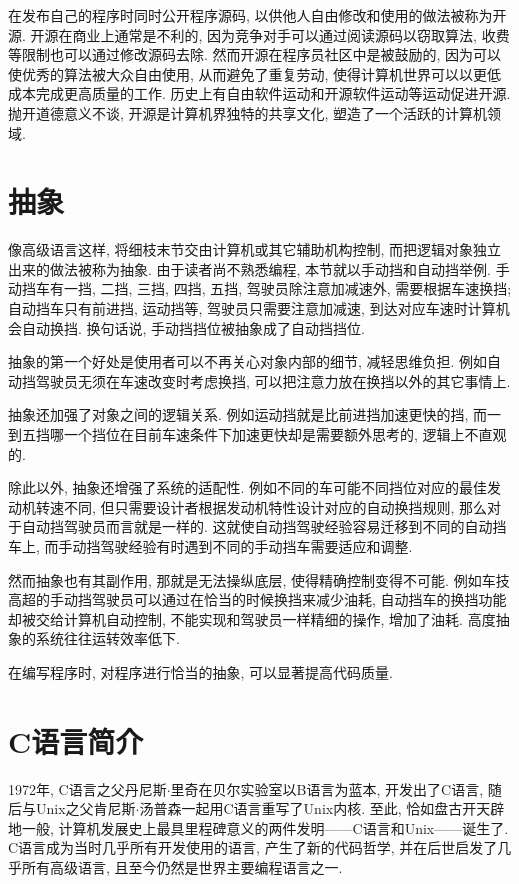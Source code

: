         在发布自己的程序时同时公开程序源码, 以供他人自由修改和使用的做法被称为开源. 开源在商业上通常是不利的, 因为竞争对手可以通过阅读源码以窃取算法, 收费等限制也可以通过修改源码去除. 然而开源在程序员社区中是被鼓励的, 因为可以使优秀的算法被大众自由使用, 从而避免了重复劳动, 使得计算机世界可以以更低成本完成更高质量的工作. 历史上有自由软件运动和开源软件运动等运动促进开源. 抛开道德意义不谈, 开源是计算机界独特的共享文化, 塑造了一个活跃的计算机领域.

    \section{抽象}
        像高级语言这样, 将细枝末节交由计算机或其它辅助机构控制, 而把逻辑对象独立出来的做法被称为抽象. 由于读者尚不熟悉编程, 本节就以手动挡和自动挡举例. 手动挡车有一挡, 二挡, 三挡, 四挡, 五挡, 驾驶员除注意加减速外, 需要根据车速换挡; 自动挡车只有前进挡, 运动挡等, 驾驶员只需要注意加减速, 到达对应车速时计算机会自动换挡. 换句话说, 手动挡挡位被抽象成了自动挡挡位.
        
        抽象的第一个好处是使用者可以不再关心对象内部的细节, 减轻思维负担. 例如自动挡驾驶员无须在车速改变时考虑换挡, 可以把注意力放在换挡以外的其它事情上.

        抽象还加强了对象之间的逻辑关系. 例如运动挡就是比前进挡加速更快的挡, 而一到五挡哪一个挡位在目前车速条件下加速更快却是需要额外思考的, 逻辑上不直观的.

        除此以外, 抽象还增强了系统的适配性. 例如不同的车可能不同挡位对应的最佳发动机转速不同, 但只需要设计者根据发动机特性设计对应的自动换挡规则, 那么对于自动挡驾驶员而言就是一样的. 这就使自动挡驾驶经验容易迁移到不同的自动挡车上, 而手动挡驾驶经验有时遇到不同的手动挡车需要适应和调整.
        
        然而抽象也有其副作用, 那就是无法操纵底层, 使得精确控制变得不可能. 例如车技高超的手动挡驾驶员可以通过在恰当的时候换挡来减少油耗, 自动挡车的换挡功能却被交给计算机自动控制, 不能实现和驾驶员一样精细的操作, 增加了油耗. 高度抽象的系统往往运转效率低下.

        在编写程序时, 对程序进行恰当的抽象, 可以显著提高代码质量.

    \section{C语言简介} \label{C语言简介}
        1972年, C语言之父丹尼斯$\cdot$里奇在贝尔实验室以B语言为蓝本, 开发出了C语言, 随后与Unix之父肯尼斯$\cdot$汤普森一起用C语言重写了Unix内核. 至此, 恰如盘古开天辟地一般, 计算机发展史上最具里程碑意义的两件发明——C语言和Unix——诞生了. C语言成为当时几乎所有开发使用的语言, 产生了新的代码哲学, 并在后世启发了几乎所有高级语言, 且至今仍然是世界主要编程语言之一. 
        
